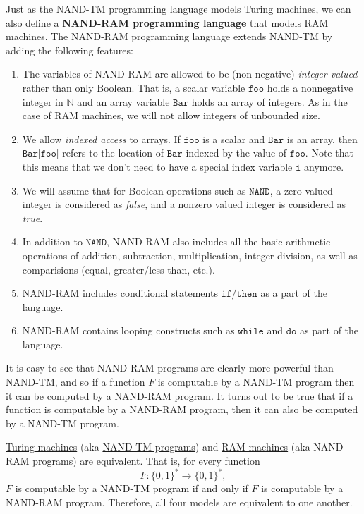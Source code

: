   Just as the NAND-TM programming language models Turing machines, we can also define a \textbf{NAND-RAM programming language} that models RAM machines. The NAND-RAM programming language extends NAND-TM by adding the following features: 
  \begin{enumerate}
      \item The variables of NAND-RAM are allowed to be (non-negative) \textit{integer valued} rather than only Boolean. That is, a scalar variable $\texttt{foo}$ holds a nonnegative integer in $\mathbb{N}$ and an array variable $\texttt{Bar}$ holds an array of integers. As in the case of RAM machines, we will not allow integers of unbounded size. 
      \item We allow \textit{indexed access} to arrays. If $\texttt{foo}$ is a scalar and $\texttt{Bar}$ is an array, then $\texttt{Bar[foo]}$ refers to the location of $\texttt{Bar}$ indexed by the value of $\texttt{foo}$. Note that this means that we don't need to have a special index variable $\texttt{i}$ anymore. 
      \item We will assume that for Boolean operations such as $\texttt{NAND}$, a zero valued integer is considered as \textit{false}, and a nonzero valued integer is considered as \textit{true}. 
      \item In addition to $\texttt{NAND}$, NAND-RAM also includes all the basic arithmetic operations of addition, subtraction, multiplication, integer division, as well as comparisions (equal, greater/less than, etc.). 
      \item NAND-RAM includes \hyperref[def:conditional-statement]{conditional statements} $\texttt{if/then}$ as a part of the language. 
      \item NAND-RAM contains looping constructs such as $\texttt{while}$ and $\texttt{do}$ as part of the language. 
  \end{enumerate}

  It is easy to see that NAND-RAM programs are clearly more powerful than NAND-TM, and so if a function $F$ is computable by a NAND-TM program then it can be computed by a NAND-RAM program. It turns out to be true that if a function is computable by a NAND-RAM program, then it can also be computed by a NAND-TM program. 

  \begin{theorem}
    \label{thm:equivalence-of-turing-and-ram-machines}
  \hyperref[def:turing-machine]{Turing machines} (aka \hyperref[def:nand-tm-programs]{NAND-TM programs}) and \hyperref[def:ram-machine]{RAM machines} (aka NAND-RAM programs) are equivalent. That is, for every function 
  \begin{equation}
    F: \{0,1\}^* \to \{0,1\}^* ,
  \end{equation}
  $F$ is computable by a NAND-TM program if and only if $F$ is computable by a NAND-RAM program. Therefore, all four models are equivalent to one another. 
  \end{theorem}

